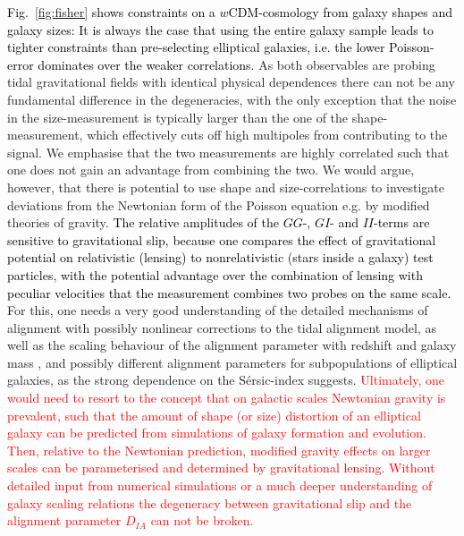 \documentclass[a4paper,fleqn,usenatbib]{mnras}
\newcommand\spirou[1]{\textcolor{black}{#1}}
\newcommand\foca[1]{\textcolor{red}{#1}}
\begin{document}
\spirou{Fig.~\ref{fig:fisher} shows constraints on a $w$CDM-cosmology from galaxy shapes and galaxy sizes: It is always the case that using the entire galaxy sample leads to tighter constraints than pre-selecting elliptical galaxies, i.e. the lower Poisson-error dominates over the weaker correlations.} As both observables are probing tidal gravitational fields with identical physical dependences there can not be any fundamental difference in the degeneracies, with the only exception that the noise in the size-measurement is typically larger than the one of the shape-measurement, which effectively cuts off high multipoles from contributing to the signal. We emphasise that the two measurements are highly correlated such that one does not gain an advantage from combining the two. We would argue, however, that there is potential to use shape and size-correlations to investigate deviations from the Newtonian form of the Poisson equation e.g. by modified theories of gravity. \spirou{The relative amplitudes of the $GG$-, $GI$- and $II$-terms are sensitive to gravitational slip, because one compares the effect of gravitational potential on relativistic (lensing) to nonrelativistic (stars inside a galaxy) test particles, with the potential advantage over the combination of lensing with peculiar velocities that the measurement combines two probes on the same scale.} For this, one needs a very good understanding of the detailed mechanisms of alignment with possibly nonlinear corrections to the tidal alignment model, as well as the scaling behaviour of the alignment parameter with redshift and galaxy mass \citep{hirata_intrinsic_2007}, and possibly different alignment parameters for subpopulations of elliptical galaxies, as the strong dependence on the S{\'e}rsic-index suggests. \foca{Ultimately, one would need to resort to the concept that on galactic scales Newtonian gravity is prevalent, such that the amount of shape (or size) distortion of an elliptical galaxy can be predicted from simulations of galaxy formation and evolution. Then, relative to the Newtonian prediction, modified gravity effects on larger scales can be parameterised and determined by gravitational lensing. Without detailed input from numerical simulations or a much deeper understanding of galaxy scaling relations the degeneracy between gravitational slip and the alignment parameter $D_{IA}$ can not be broken.}
\end{document}
